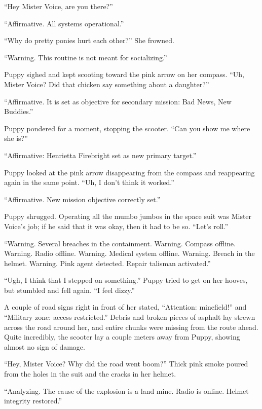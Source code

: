 ``Hey Mister Voice, are you there?''

{\mten ``Affirmative. All systems operational.''}

``Why do pretty ponies hurt each other?'' She frowned.

{\mten ``Warning. This routine is not meant for socializing.''}

Puppy sighed and kept scooting toward the pink arrow on her compass. ``Uh, Mister Voice? Did that chicken say something about a daughter?''

{\mten ``Affirmative. It is set as objective for secondary mission: Bad News, New Buddies.''}

Puppy pondered for a moment, stopping the scooter. ``Can you show me where she is?''

{\mten ``Affirmative: Henrietta Firebright set as new primary target.''}

Puppy looked at the pink arrow disappearing from the compass and reappearing again in the same point. ``Uh, I don't think it worked.''

{\mten ``Affirmative. New mission objective correctly set.''}

Puppy shrugged. Operating all the mumbo jumbos in the space suit was Mister Voice's job; if he said that it was okay, then it had to be so. ``Let's roll.''


\horizonline


{\mten ``Warning. Several breaches in the containment. Warning. Compass offline. Warning. Radio offline. Warning. Medical system offline. Warning. Breach in the helmet. Warning. Pink agent detected. Repair talisman activated.''}

``Ugh, I think that I stepped on something.'' Puppy tried to get on her hooves, but stumbled and fell again. ``I feel dizzy.''

A couple of road signs right in front of her stated, ``Attention: minefield!'' and ``Military zone: access restricted.'' Debris and broken pieces of asphalt lay strewn across the road around her, and entire chunks were missing from the route ahead. Quite incredibly, the scooter lay a couple meters away from Puppy, showing almost no sign of damage.

``Hey, Mister Voice? Why did the road went boom?'' Thick pink smoke poured from the holes in the suit and the cracks in her helmet.

{\mten ``Analyzing. The cause of the explosion is a land mine. Radio is online. Helmet integrity restored.''}

